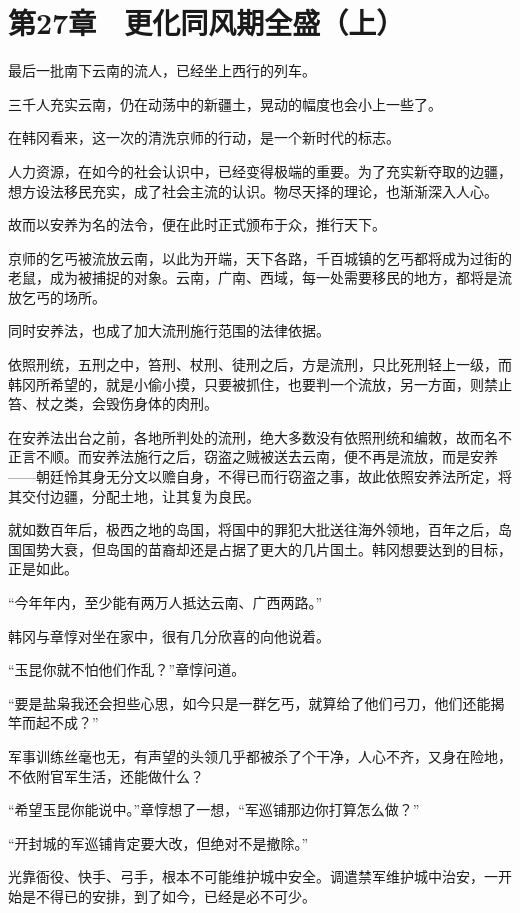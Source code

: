 \section{第27章　更化同风期全盛（上）}

最后一批南下云南的流人，已经坐上西行的列车。

三千人充实云南，仍在动荡中的新疆土，晃动的幅度也会小上一些了。

在韩冈看来，这一次的清洗京师的行动，是一个新时代的标志。

人力资源，在如今的社会认识中，已经变得极端的重要。为了充实新夺取的边疆，想方设法移民充实，成了社会主流的认识。物尽天择的理论，也渐渐深入人心。

故而以安养为名的法令，便在此时正式颁布于众，推行天下。

京师的乞丐被流放云南，以此为开端，天下各路，千百城镇的乞丐都将成为过街的老鼠，成为被捕捉的对象。云南，广南、西域，每一处需要移民的地方，都将是流放乞丐的场所。

同时安养法，也成了加大流刑施行范围的法律依据。

依照刑统，五刑之中，笞刑、杖刑、徒刑之后，方是流刑，只比死刑轻上一级，而韩冈所希望的，就是小偷小摸，只要被抓住，也要判一个流放，另一方面，则禁止笞、杖之类，会毁伤身体的肉刑。

在安养法出台之前，各地所判处的流刑，绝大多数没有依照刑统和编敇，故而名不正言不顺。而安养法施行之后，窃盗之贼被送去云南，便不再是流放，而是安养——朝廷怜其身无分文以赡自身，不得已而行窃盗之事，故此依照安养法所定，将其交付边疆，分配土地，让其复为良民。

就如数百年后，极西之地的岛国，将国中的罪犯大批送往海外领地，百年之后，岛国国势大衰，但岛国的苗裔却还是占据了更大的几片国土。韩冈想要达到的目标，正是如此。

“今年年内，至少能有两万人抵达云南、广西两路。”

韩冈与章惇对坐在家中，很有几分欣喜的向他说着。

“玉昆你就不怕他们作乱？”章惇问道。

“要是盐枭我还会担些心思，如今只是一群乞丐，就算给了他们弓刀，他们还能揭竿而起不成？”

军事训练丝毫也无，有声望的头领几乎都被杀了个干净，人心不齐，又身在险地，不依附官军生活，还能做什么？

“希望玉昆你能说中。”章惇想了一想，“军巡铺那边你打算怎么做？”

“开封城的军巡铺肯定要大改，但绝对不是撤除。”

光靠衙役、快手、弓手，根本不可能维护城中安全。调遣禁军维护城中治安，一开始是不得已的安排，到了如今，已经是必不可少。

